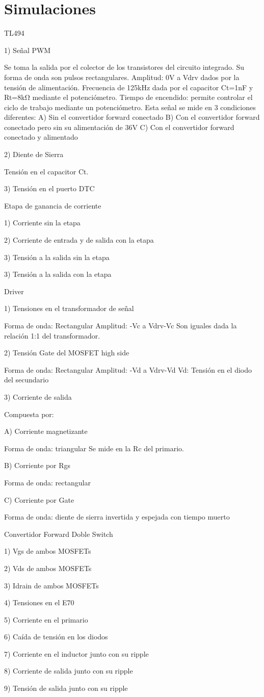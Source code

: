\section{Simulaciones}

TL494

1) Señal PWM

Se toma la salida por el colector de los transistores del circuito integrado. 
Su forma de onda son pulsos rectangulares. 
Amplitud: 0V a Vdrv dados por la tensión de alimentación.
Frecuencia de 125kHz dada por el capacitor Ct=1nF y Rt=8kΩ mediante el potenciómetro. 
Tiempo de encendido: permite controlar el ciclo de trabajo mediante un potenciómetro. 
Esta señal se mide en 3 condiciones diferentes: 
A) Sin el convertidor forward conectado
B) Con el convertidor forward conectado pero sin su alimentación de 36V
C) Con el convertidor forward conectado y alimentado

2) Diente de Sierra 

Tensión en el capacitor Ct. 

3) Tensión en el puerto DTC 

Etapa de ganancia de corriente

1) Corriente sin la etapa

2) Corriente de entrada y de salida con la etapa 

3) Tensión a la salida sin la etapa

3) Tensión a la salida con la etapa

Driver

1) Tensiones en el transformador de señal 

Forma de onda: Rectangular 
Amplitud: -Vc a Vdrv-Vc 
Son iguales dada la relación 1:1 del transformador. 

2) Tensión Gate del MOSFET high side 

Forma de onda: Rectangular 
Amplitud: -Vd a Vdrv-Vd
Vd: Tensión en el diodo del secundario

3) Corriente de salida

Compuesta por:

A) Corriente magnetizante

Forma de onda: triangular
Se mide en la Rc del primario. 

B) Corriente por Rgs

Forma de onda: rectangular

C) Corriente por Gate

Forma de onda: diente de sierra invertida y espejada con tiempo muerto 

Convertidor Forward Doble Switch 

1) Vgs de ambos MOSFETs

2) Vds de ambos MOSFETs

3) Idrain de ambos MOSFETs

4) Tensiones en el E70

5) Corriente en el primario

6) Caída de tensión en los diodos

7) Corriente en el inductor junto con su ripple

8) Corriente de salida junto con su ripple 

9) Tensión de salida junto con su ripple 
